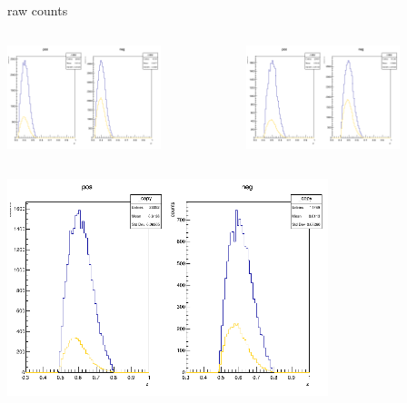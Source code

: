 \begin{frame}{raw counts}
\begin{columns}
\begin{column}[T]{0.5\textwidth}
\includegraphics[width = 0.7\textwidth]{results/yield/statistics/counts_x_Q2_z_0.45_3.898_0.40.png}
\end{column}
\begin{column}[T]{0.5\textwidth}
\includegraphics[width = 0.7\textwidth]{results/yield/statistics/counts_x_Q2_z_0.45_3.898_0.50.png}
\end{column}
\end{columns}
\begin{columns}
\begin{column}[T]{0.5\textwidth}
\includegraphics[width = 0.7\textwidth]{results/yield/statistics/counts_x_Q2_z_0.45_3.898_0.60.png}

\end{column}
\end{columns}
\end{frame}
